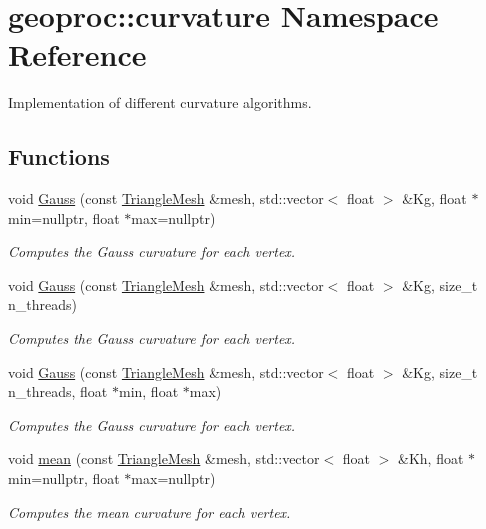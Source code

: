 \hypertarget{namespacegeoproc_1_1curvature}{}\section{geoproc\+:\+:curvature Namespace Reference}
\label{namespacegeoproc_1_1curvature}


Implementation of different curvature algorithms.  


\subsection*{Functions}
\begin{DoxyCompactItemize}
\item 
void \hyperlink{namespacegeoproc_1_1curvature_a1d38de2a33224952f31f3447aafb9484}{Gauss} (const \hyperlink{classgeoproc_1_1TriangleMesh}{Triangle\+Mesh} \&mesh, std\+::vector$<$ float $>$ \&Kg, float $\ast$min=nullptr, float $\ast$max=nullptr)
\begin{DoxyCompactList}\small\item\em Computes the Gauss curvature for each vertex. \end{DoxyCompactList}\item 
void \hyperlink{namespacegeoproc_1_1curvature_a2b648a2fed90b2541e2c4c48b0bdc514}{Gauss} (const \hyperlink{classgeoproc_1_1TriangleMesh}{Triangle\+Mesh} \&mesh, std\+::vector$<$ float $>$ \&Kg, size\+\_\+t n\+\_\+threads)
\begin{DoxyCompactList}\small\item\em Computes the Gauss curvature for each vertex. \end{DoxyCompactList}\item 
void \hyperlink{namespacegeoproc_1_1curvature_a8a166392e1df0d1f24f98a214e85aea4}{Gauss} (const \hyperlink{classgeoproc_1_1TriangleMesh}{Triangle\+Mesh} \&mesh, std\+::vector$<$ float $>$ \&Kg, size\+\_\+t n\+\_\+threads, float $\ast$min, float $\ast$max)
\begin{DoxyCompactList}\small\item\em Computes the Gauss curvature for each vertex. \end{DoxyCompactList}\item 
void \hyperlink{namespacegeoproc_1_1curvature_ac095baa6ee2f7db33430b8545eae8207}{mean} (const \hyperlink{classgeoproc_1_1TriangleMesh}{Triangle\+Mesh} \&mesh, std\+::vector$<$ float $>$ \&Kh, float $\ast$min=nullptr, float $\ast$max=nullptr)
\begin{DoxyCompactList}\small\item\em Computes the mean curvature for each vertex. \end{DoxyCompactList}\item 

\end{DoxyCompactItemize}
